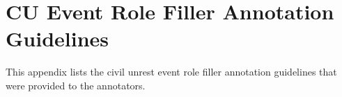 \chapter{CU Event Role Filler Annotation Guidelines}
\label{Appendix:EventRoleFillerAnnotationGuidelines}
This appendix lists the civil unrest event role filler annotation guidelines that were provided
to the annotators.





